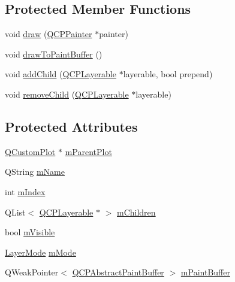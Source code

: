 \subsection*{Protected Member Functions}
\begin{DoxyCompactItemize}
\item 
void \mbox{\hyperlink{class_q_c_p_layer_ab831a99c8d30b15ec4533ca341e8813b}{draw}} (\mbox{\hyperlink{class_q_c_p_painter}{Q\+C\+P\+Painter}} $\ast$painter)
\item 
void \mbox{\hyperlink{class_q_c_p_layer_a4a8e0a86f31462299e7fc8e8158dd2c6}{draw\+To\+Paint\+Buffer}} ()
\item 
void \mbox{\hyperlink{class_q_c_p_layer_a57ce5e49364aa9122276d5df3b4a0ddc}{add\+Child}} (\mbox{\hyperlink{class_q_c_p_layerable}{Q\+C\+P\+Layerable}} $\ast$layerable, bool prepend)
\item 
void \mbox{\hyperlink{class_q_c_p_layer_ac2f64ac7761650582d968d86670ef362}{remove\+Child}} (\mbox{\hyperlink{class_q_c_p_layerable}{Q\+C\+P\+Layerable}} $\ast$layerable)
\end{DoxyCompactItemize}
\subsection*{Protected Attributes}
\begin{DoxyCompactItemize}
\item 
\mbox{\hyperlink{class_q_custom_plot}{Q\+Custom\+Plot}} $\ast$ \mbox{\hyperlink{class_q_c_p_layer_a2f3374a7884bf403720cd1cf6f7ad1bb}{m\+Parent\+Plot}}
\item 
Q\+String \mbox{\hyperlink{class_q_c_p_layer_a91e6298183cb4b9dfd4efdfaf1ecc220}{m\+Name}}
\item 
int \mbox{\hyperlink{class_q_c_p_layer_a122088bcab6cec76a52b75ce8606605b}{m\+Index}}
\item 
Q\+List$<$ \mbox{\hyperlink{class_q_c_p_layerable}{Q\+C\+P\+Layerable}} $\ast$ $>$ \mbox{\hyperlink{class_q_c_p_layer_a704aa71bba469383c3a3c598c1ec0d28}{m\+Children}}
\item 
bool \mbox{\hyperlink{class_q_c_p_layer_a264950deb08e589460c126c895a1e2b5}{m\+Visible}}
\item 
\mbox{\hyperlink{class_q_c_p_layer_a67dcfc1590be2a1f2227c5a39bb59c7c}{Layer\+Mode}} \mbox{\hyperlink{class_q_c_p_layer_a11bd0aa190d8fa21c8c7673d070737c8}{m\+Mode}}
\item 
Q\+Weak\+Pointer$<$ \mbox{\hyperlink{class_q_c_p_abstract_paint_buffer}{Q\+C\+P\+Abstract\+Paint\+Buffer}} $>$ \mbox{\hyperlink{class_q_c_p_layer_aa0bdbc75e4350a0669ff515b3476a3d3}{m\+Paint\+Buffer}}
\end{DoxyCompactItemize}
